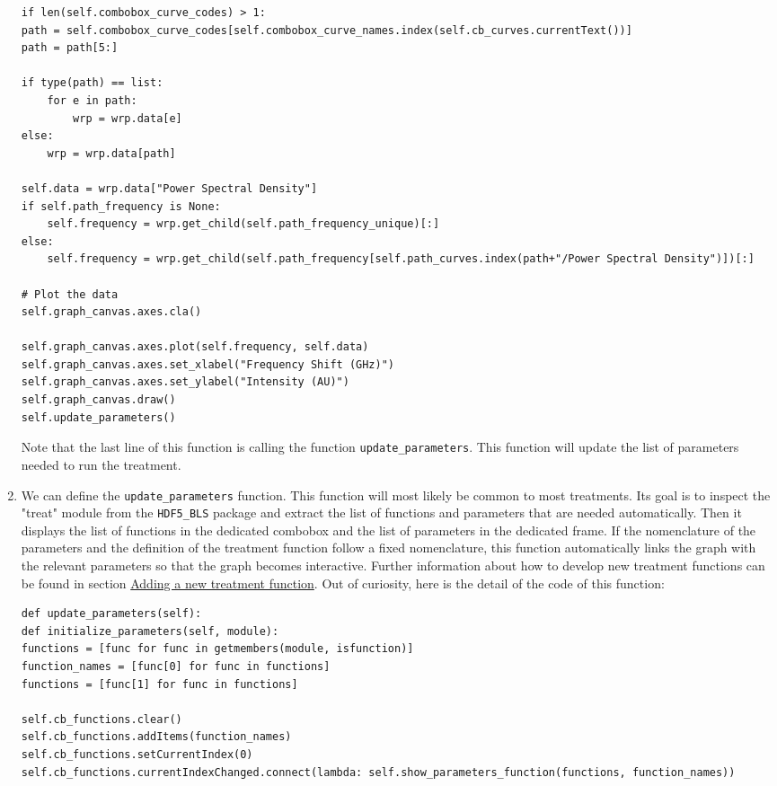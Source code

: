 \begin{enumerate}
\begin{lstlisting}
if len(self.combobox_curve_codes) > 1:
path = self.combobox_curve_codes[self.combobox_curve_names.index(self.cb_curves.currentText())]
path = path[5:]

if type(path) == list:
    for e in path:
        wrp = wrp.data[e]
else:
    wrp = wrp.data[path]

self.data = wrp.data["Power Spectral Density"]
if self.path_frequency is None:
    self.frequency = wrp.get_child(self.path_frequency_unique)[:]
else:
    self.frequency = wrp.get_child(self.path_frequency[self.path_curves.index(path+"/Power Spectral Density")])[:]

# Plot the data
self.graph_canvas.axes.cla()

self.graph_canvas.axes.plot(self.frequency, self.data)
self.graph_canvas.axes.set_xlabel("Frequency Shift (GHz)")
self.graph_canvas.axes.set_ylabel("Intensity (AU)")
self.graph_canvas.draw()
self.update_parameters()
\end{lstlisting}
    Note that the last line of this function is calling the function \texttt{update\_parameters}. This function will update the list of parameters needed to run the treatment. 
    \item We can define the \texttt{update\_parameters} function. This function will most likely be common to most treatments. Its goal is to inspect the "treat" module from the \texttt{HDF5\_BLS} package and extract the list of functions and parameters that are needed automatically. Then it displays the list of functions in the dedicated combobox and the list of parameters in the dedicated frame. If the nomenclature of the parameters and the definition of the treatment function follow a fixed nomenclature, this function automatically links the graph with the relevant parameters so that the graph becomes interactive. Further information about how to develop new treatment functions can be found in section \hyperref[subsec:treatment.new]{Adding a new treatment function}. Out of curiosity, here is the detail of the code of this function:
\begin{lstlisting}
def update_parameters(self):
def initialize_parameters(self, module):
functions = [func for func in getmembers(module, isfunction)]
function_names = [func[0] for func in functions]
functions = [func[1] for func in functions]

self.cb_functions.clear()
self.cb_functions.addItems(function_names)
self.cb_functions.setCurrentIndex(0)
self.cb_functions.currentIndexChanged.connect(lambda: self.show_parameters_function(functions, function_names))


\end{lstlisting}
\end{enumerate}
